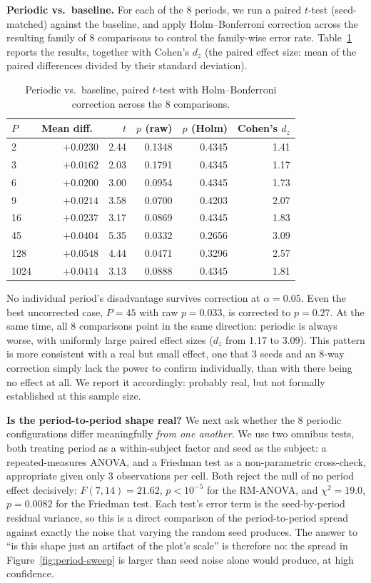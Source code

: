 \documentclass[11pt]{article}
\begin{document}
\textbf{Periodic vs.\ baseline.} For each of the 8 periods, we run a paired $t$-test (seed-matched) against the baseline, and apply Holm--Bonferroni correction \citep{holm1979} across the resulting family of 8 comparisons to control the family-wise error rate. Table~\ref{tab:stats} reports the results, together with Cohen's $d_z$ (the paired effect size: mean of the paired differences divided by their standard deviation).

\begin{table}[h]
\centering
\caption{Periodic vs.\ baseline, paired $t$-test with Holm--Bonferroni correction across the 8 comparisons.}
\label{tab:stats}
\begin{tabular}{lrrrrr}
\toprule
$P$ & Mean diff.\ & $t$ & $p$ (raw) & $p$ (Holm) & Cohen's $d_z$ \\
\midrule
2 & $+0.0230$ & 2.44 & 0.1348 & 0.4345 & 1.41 \\
3 & $+0.0162$ & 2.03 & 0.1791 & 0.4345 & 1.17 \\
6 & $+0.0200$ & 3.00 & 0.0954 & 0.4345 & 1.73 \\
9 & $+0.0214$ & 3.58 & 0.0700 & 0.4203 & 2.07 \\
16 & $+0.0237$ & 3.17 & 0.0869 & 0.4345 & 1.83 \\
45 & $+0.0404$ & 5.35 & 0.0332 & 0.2656 & 3.09 \\
128 & $+0.0548$ & 4.44 & 0.0471 & 0.3296 & 2.57 \\
1024 & $+0.0414$ & 3.13 & 0.0888 & 0.4345 & 1.81 \\
\bottomrule
\end{tabular}
\end{table}

No individual period's disadvantage survives correction at $\alpha = 0.05$. Even the best uncorrected case, $P=45$ with raw $p=0.033$, is corrected to $p=0.27$. At the same time, all 8 comparisons point in the same direction: periodic is always worse, with uniformly large paired effect sizes ($d_z$ from 1.17 to 3.09). This pattern is more consistent with a real but small effect, one that 3 seeds and an 8-way correction simply lack the power to confirm individually, than with there being no effect at all. We report it accordingly: probably real, but not formally established at this sample size.

\textbf{Is the period-to-period shape real?} We next ask whether the 8 periodic configurations differ meaningfully \emph{from one another}. We use two omnibus tests, both treating period as a within-subject factor and seed as the subject: a repeated-measures ANOVA, and a Friedman test as a non-parametric cross-check, appropriate given only 3 observations per cell. Both reject the null of no period effect decisively: $F(7,14) = 21.62$, $p < 10^{-5}$ for the RM-ANOVA, and $\chi^2 = 19.0$, $p = 0.0082$ for the Friedman test. Each test's error term is the seed-by-period residual variance, so this is a direct comparison of the period-to-period spread against exactly the noise that varying the random seed produces. The answer to ``is this shape just an artifact of the plot's scale'' is therefore no: the spread in Figure~\ref{fig:period-sweep} is larger than seed noise alone would produce, at high confidence.
\end{document}
